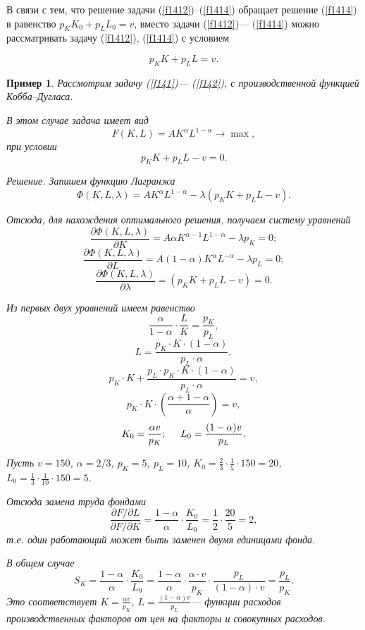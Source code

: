 \documentclass[12pt,openbib]{report}
\newtheorem{pri}{\hspace{5mm} Пример}[chapter]
\begin{document}
В связи с тем, что решение задачи (\ref{f1412})--(\ref{f1414}) обращает
решение (\ref{f1414}) в равенство $p_KK_0+p_LL_0=v$, вместо задачи
(\ref{f1412})--- (\ref{f1414}) можно рассматривать задачу (\ref{f1412}), (\ref{f1414}) с
условием

\begin{equation}\label{f1415}
p_KK+p_LL=v.
\end{equation}

\begin{pri} Рассмотрим задачу (\ref{f141})--- (\ref{f142}), с
производственной функцией Кобба--Дугласа.

В этом случае задача имеет вид $$F(K,L)=AK^\alpha
L^{1-\alpha}\to\max,$$ при условии $$p_KK+p_LL-v=0.$$

Решение. Запишем функцию Лагранжа $$\Phi(K,L,\lambda)=AK^\alpha
L^{1-\alpha}-\lambda (p_KK+p_LL-v).$$

Отсюда, для нахождения оптимального решения, получаем систему
уравнений
$$\frac{\partial\Phi(K,L,\lambda)}{\partial K}=A\alpha K^{\alpha-1}
L^{1-\alpha}-\lambda p_K=0;$$
$$\frac{\partial\Phi(K,L,\lambda)}{\partial L}=A(1-\alpha)K^\alpha
L^{-\alpha}-\lambda p_L=0;$$
$$\frac{\partial\Phi(K,L,\lambda)}{\partial\lambda}=(p_KK+p_LL-v)=0.$$

Из первых двух уравнений имеем равенство
$$\frac\alpha{1-\alpha}\cdot\frac LK=\frac{p_K}{p_L},$$
$$L=\frac{p_K\cdot K\cdot(1-\alpha)}{p_L\cdot\alpha},$$
$$p_K\cdot K+\frac{p_L\cdot p_K\cdot
K\cdot(1-\alpha)}{p_L\cdot\alpha}=v,$$
$$p_K\cdot K\cdot\left(\frac{\alpha+1-\alpha}\alpha\right)=v,$$
\begin{equation}\label{f1416}
K_0=\frac{\alpha v}{p_K};\hspace{5mm}L_0=\frac{(1-\alpha)v}{p_L}.
\end{equation}

Пусть $v=150$, $\alpha=2/3$, $p_K=5$, $p_L=10$,
$K_0=\frac23\cdot\frac15\cdot150=20$,
$L_0=\frac13\cdot\frac1{10}\cdot150=5$.

Отсюда замена труда фондами $$\frac{\partial F/\partial L}{\partial
F/\partial
K}=\frac{1-\alpha}\alpha\cdot\frac{K_0}{L_0}=\frac12\cdot\frac{20}5=2,$$
т.е. один работающий может быть заменен двумя единицами фонда.

В общем случае
$$S_K=\frac{1-\alpha}\alpha\cdot\frac{K_0}{L_0}=\frac{1-\alpha}\alpha\cdot
\frac{\alpha\cdot v}{p_K}\cdot\frac{p_L}{(1-\alpha)\cdot v
}=\frac{p_L}{p_K}.$$ Это соответствует $K=\frac{\alpha v}{p_K}$,
$L=\frac{(1-\alpha)v}{p_L}$--- функции расходов производственных
факторов от цен на факторы и совокупных расходов.
\end{pri}
\end{document}
